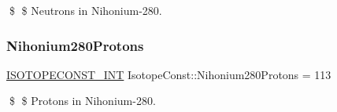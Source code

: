 \$ \$ Neutrons in Nihonium-\/280. \mbox{\label{group___isotope_const-_nihonium-_nh280_ga01fa88cb44c135ea469f7dfc01b2ab83}} 
\subsubsection{\texorpdfstring{Nihonium280\+Protons}{Nihonium280Protons}}
{\footnotesize\ttfamily \mbox{\hyperlink{group___isotope_const-_macros_ga5f18360b3e99483a35c32d789e62621c}{I\+S\+O\+T\+O\+P\+E\+C\+O\+N\+S\+T\+\_\+\+I\+NT}} Isotope\+Const\+::\+Nihonium280\+Protons = 113}

\$ \$ Protons in Nihonium-\/280. 
